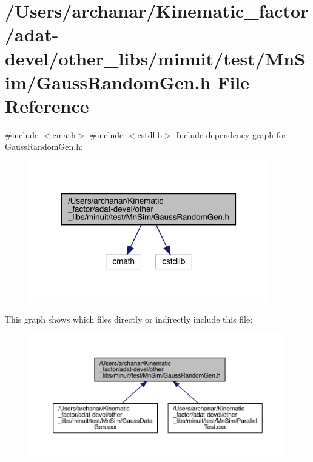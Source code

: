 \hypertarget{adat-devel_2other__libs_2minuit_2test_2MnSim_2GaussRandomGen_8h}{}\section{/\+Users/archanar/\+Kinematic\+\_\+factor/adat-\/devel/other\+\_\+libs/minuit/test/\+Mn\+Sim/\+Gauss\+Random\+Gen.h File Reference}
\label{adat-devel_2other__libs_2minuit_2test_2MnSim_2GaussRandomGen_8h}
{\ttfamily \#include $<$cmath$>$}\newline
{\ttfamily \#include $<$cstdlib$>$}\newline
Include dependency graph for Gauss\+Random\+Gen.\+h\+:
\nopagebreak
\begin{figure}[H]
\begin{center}
\leavevmode
\includegraphics[width=296pt]{d9/d73/adat-devel_2other__libs_2minuit_2test_2MnSim_2GaussRandomGen_8h__incl}
\end{center}
\end{figure}
This graph shows which files directly or indirectly include this file\+:
\nopagebreak
\begin{figure}[H]
\begin{center}
\leavevmode
\includegraphics[width=350pt]{d3/d83/adat-devel_2other__libs_2minuit_2test_2MnSim_2GaussRandomGen_8h__dep__incl}
\end{center}
\end{figure}
